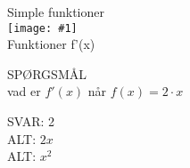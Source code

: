 \documentclass[]{article}
\newenvironment{question}[2]{SPØRGSMÅL\\}{\hspace{50px}}
\newcommand{\name}[1]{{\huge #1}\\}
\newcommand{\tag}[1]{#1}
\newcommand{\cover}[1]{\texttt{[image: \#1]}\\}
\newcommand{\image}[1]{\texttt{[image: \#1]}\\}
\newcommand{\answer}[1]{{\color{green} SVAR: #1}\\}
\newcommand{\alt}[1]{{\color{red} ALT: #1}\\}
\begin{document}
\name{Simple funktioner}
\cover{test.png}
\tag{Funktioner}
\tag{f'(x)}

\begin{question}{multi}
    
Hvad er $f'(x)$ når $f(x)=2\cdot x$


\answer{2}
\alt{$2x$}
\alt{$x^2$}

\end{question}
\end{document}
